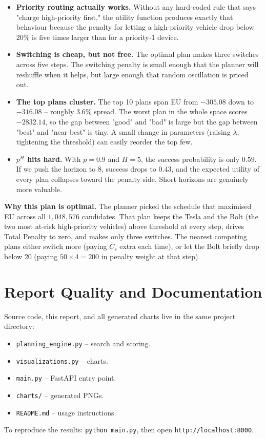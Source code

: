 \documentclass[11pt,a4paper]{article}
\begin{document}
\begin{itemize}[leftmargin=1.3em, itemsep=3pt]
    \item \textbf{Priority routing actually works.} Without any hard-coded
          rule that says "charge high-priority first," the utility function
          produces exactly that behaviour because the penalty for letting a
          high-priority vehicle drop below 20\% is five times larger than for
          a priority-1 device.
    \item \textbf{Switching is cheap, but not free.} The optimal plan makes
          three switches across five steps. The switching penalty is small
          enough that the planner will reshuffle when it helps, but large
          enough that random oscillation is priced out.
    \item \textbf{The top plans cluster.} The top 10 plans span EU from
          $-305.08$ down to $-316.08$ -- roughly 3.6\% spread. The worst
          plan in the whole space scores $-2832.14$, so the gap between
          "good" and "bad" is large but the gap between "best" and
          "near-best" is tiny. A small change in parameters (raising
          $\lambda$, tightening the threshold) can easily reorder the top
          few.
    \item \textbf{$p^H$ hits hard.} With $p=0.9$ and $H=5$, the success
          probability is only $0.59$. If we push the horizon to 8, success
          drops to $0.43$, and the expected utility of every plan collapses
          toward the penalty side. Short horizons are genuinely more
          valuable.
\end{itemize}

\textbf{Why this plan is optimal.} The planner picked the schedule that
maximised EU across all $1{,}048{,}576$ candidates. That plan keeps the Tesla
and the Bolt (the two most at-risk high-priority vehicles) above threshold at
every step, drives Total Penalty to zero, and makes only three switches. The
nearest competing plans either switch more (paying $C_s$ extra each time), or
let the Bolt briefly drop below 20 (paying $50 \times 4 = 200$ in penalty
weight at that step).

\section{Report Quality and Documentation}

Source code, this report, and all generated charts live in the same project
directory:
\begin{itemize}[leftmargin=1.3em, itemsep=1pt]
    \item \texttt{planning\_engine.py} -- search and scoring.
    \item \texttt{visualizations.py} -- charts.
    \item \texttt{main.py} -- FastAPI entry point.
    \item \texttt{charts/} -- generated PNGs.
    \item \texttt{README.md} -- usage instructions.
\end{itemize}
To reproduce the results: \texttt{python main.py}, then open
\texttt{http://localhost:8000}.
\end{document}
